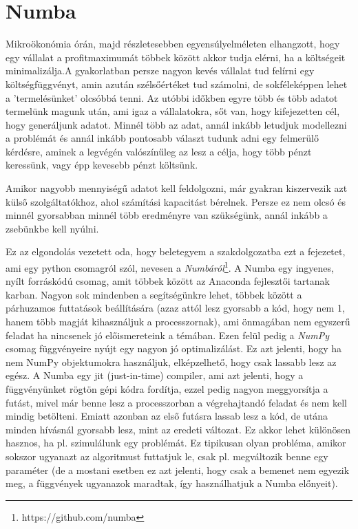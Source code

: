 \documentclass{article}
\theoremstyle{definition}
\theoremstyle{theorem}
\begin{document}
\section{Numba}
Mikroökonómia órán, majd részletesebben egyensúlyelméleten elhangzott, hogy egy vállalat a profitmaximumát többek között akkor tudja elérni, ha a költségeit minimalizálja.A gyakorlatban persze nagyon kevés vállalat tud felírni egy költségfüggvényt, amin azután szélsőértéket tud számolni, de sokféleképpen lehet a 'termelésünket' olcsóbbá tenni. Az utóbbi időkben egyre több és több adatot termelünk magunk után, ami igaz a vállalatokra, sőt van, hogy kifejezetten cél, hogy generáljunk adatot. Minnél több az adat, annál inkább letudjuk modellezni a problémát és annál inkább pontosabb választ tudunk adni egy felmerülő kérdésre, aminek a legvégén valószínűleg az lesz a célja, hogy több pénzt keressünk, vagy épp kevesebb pénzt költsünk.

Amikor nagyobb mennyiségű adatot kell feldolgozni, már gyakran kiszervezik azt külső szolgáltatókhoz, ahol számítási kapacitást bérelnek. Persze ez nem olcsó és minnél gyorsabban minnél több eredményre van szükségünk, annál inkább a zsebünkbe kell nyúlni.

Ez az elgondolás vezetett oda, hogy beletegyem a szakdolgozatba ezt a fejezetet, ami egy python csomagról szól, nevesen a \textit{Numbáról}\footnote{https://github.com/numba}.
\newline
A Numba egy ingyenes, nyílt forráskódú csomag, amit többek között az Anaconda fejlesztői tartanak karban. Nagyon sok mindenben a segítségünkre lehet, többek között a párhuzamos futtatások beállítására (azaz attól lesz gyorsabb a kód, hogy nem 1, hanem több magját kihasználjuk a processzornak), ami önmagában nem egyszerű feladat ha nincsenek jó előismereteink a témában. Ezen felül pedig a \textit{NumPy} csomag függvényeire nyújt egy nagyon jó optimalizálást. Ez azt jelenti, hogy ha nem NumPy objektumokra használjuk, elképzelhető, hogy csak lassabb lesz az egész.\newline
A Numba egy jit (just-in-time) compiler, ami azt jelenti, hogy a függvényünket rögtön gépi kódra fordítja, ezzel pedig nagyon meggyorsítja a futást, mivel már benne lesz a processzorban a végrehajtandó feladat és nem kell mindig betölteni. Emiatt azonban az első futásra lassab lesz a kód, de utána minden hívásnál gyorsabb lesz, mint az eredeti változat. Ez akkor lehet különösen hasznos, ha pl. szimulálunk egy problémát. Ez tipikusan olyan probléma, amikor sokszor ugyanazt az algoritmust futtatjuk le, csak pl. megváltozik benne egy paraméter (de a mostani esetben ez azt jelenti, hogy csak a bemenet nem egyezik meg, a függvények ugyanazok maradtak, így használhatjuk a Numba előnyeit).
\end{document}
